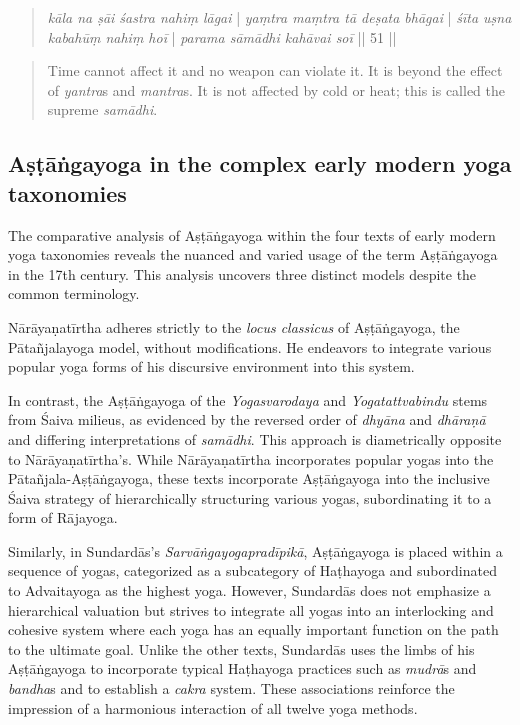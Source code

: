 \begin{quote}
\textit{kāla na ṣāi śastra nahiṃ lāgai} | \textit{yaṃtra maṃtra tā deṣata bhāgai} | 
\textit{śīta uṣna kabahūṃ nahiṃ hoī} | \textit{parama sāmādhi kahāvai soī }|| 51 || 
\end{quote}
\begin{quote}
Time cannot affect it and no weapon can violate it. It is beyond the effect of \textit{yantra}s and \textit{mantra}s. It is not affected by cold or heat; this is called the supreme \textit{samādhi}.
\end{quote}

\subsection{Aṣṭāṅgayoga in the complex early modern yoga taxonomies}

The comparative analysis of Aṣṭāṅgayoga within the four texts of early modern yoga taxonomies reveals the nuanced and varied usage of the term Aṣṭāṅgayoga in the 17th century. This analysis uncovers three distinct models despite the common terminology.

Nārāyaṇatīrtha adheres strictly to the \textit{locus classicus} of Aṣṭāṅgayoga, the Pātañjalayoga model, without modifications. He endeavors to integrate various popular yoga forms of his discursive environment into this system.

In contrast, the Aṣṭāṅgayoga of the \textit{Yogasvarodaya} and \textit{Yogatattvabindu} stems from Śaiva milieus, as evidenced by the reversed order of \textit{dhyāna} and \textit{dhāraṇā} and differing interpretations of \textit{samādhi}. This approach is diametrically opposite to Nārāyaṇatīrtha's. While Nārāyaṇatīrtha incorporates popular yogas into the Pātañjala-Aṣṭāṅgayoga, these texts incorporate Aṣṭāṅgayoga into the inclusive Śaiva strategy of hierarchically structuring various yogas, subordinating it to a form of Rājayoga.

Similarly, in Sundardās's \emph{Sarvāṅgayogapradīpikā}, Aṣṭāṅgayoga is placed within a sequence of yogas, categorized as a subcategory of Haṭhayoga and subordinated to Advaitayoga as the highest yoga. However, Sundardās does not emphasize a hierarchical valuation but strives to integrate all yogas into an interlocking and cohesive system where each yoga has an equally important function on the path to the ultimate goal. Unlike the other texts, Sundardās uses the limbs of his Aṣṭāṅgayoga to incorporate typical Haṭhayoga practices such as \textit{mudrā}s and \textit{bandha}s and to establish a \textit{cakra} system. These associations reinforce the impression of a harmonious interaction of all twelve yoga methods.

